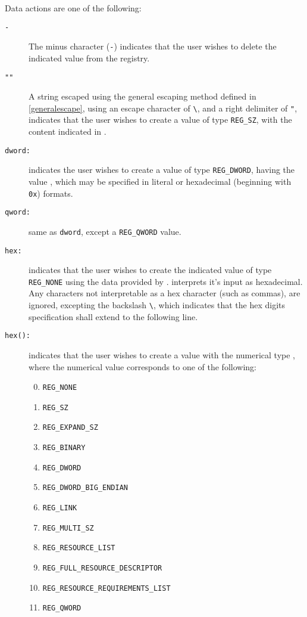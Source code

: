 Data actions are one of the following:
\begin{description}
\item[\texttt{-}] The minus character (\verb|-|) indicates that the user wishes
to delete the indicated value from the registry.
\item[\texttt{""}] A string escaped using the general escaping
method defined in \ref{generalescape}, using an escape character of \verb|\|, and a right
delimiter of \verb|"|, indicates that the user wishes to create a value of type
\verb|REG_SZ|, with the content indicated in .
\item[\texttt{dword:}] indicates the user wishes to create a value
of type \verb|REG_DWORD|, having the value , which may be specified in
literal or hexadecimal (beginning with \verb|0x|) formats.
\item[\texttt{qword:}] same as \verb|dword|, except a
\verb|REG_QWORD| value.
\item[\texttt{hex:}] indicates that the user wishes to create the
indicated value of type \verb|REG_NONE| using the data provided by
.  interprets it's input as hexadecimal. Any
characters not interpretable as a hex character (such as commas), are ignored,
excepting the backslash \verb|\|, which indicates that the hex digits
specification shall extend to the following line.
\item[\texttt{hex():}] indicates that the user wishes
to create a value with the numerical type , where the numerical value
corresponds to one of the following:
\begin{enumerate}
\setcounter{enumi}{-1}
    \item \verb|REG_NONE|
    \item \verb|REG_SZ|
    \item \verb|REG_EXPAND_SZ|
    \item \verb|REG_BINARY|
    \item \verb|REG_DWORD|
    \item \verb|REG_DWORD_BIG_ENDIAN|
    \item \verb|REG_LINK|
    \item \verb|REG_MULTI_SZ|
    \item \verb|REG_RESOURCE_LIST|
    \item \verb|REG_FULL_RESOURCE_DESCRIPTOR|
    \item \verb|REG_RESOURCE_REQUIREMENTS_LIST|
    \item \verb|REG_QWORD|

\end{enumerate}
\end{description}
